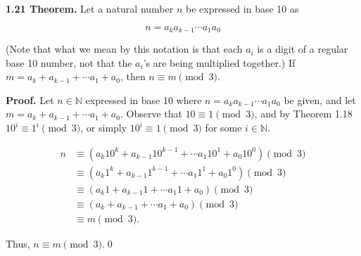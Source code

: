 \documentclass[12pt]{article}
\begin{document}
\noindent\textbf{1.21 Theorem.} Let a natural number $n$ be expressed in base 10 as

\begin{equation*}
n=a_k a_{k-1} \cdots a_1 a_0
\end{equation*}

\noindent (Note that what we mean by this notation is that each $a_i$ is a digit of a regular base 10 number, not that the $a_i$'s are being multiplied together.) If $m= a_k + a_{k-1} + \cdots a_1 + a_0$, then $n\equiv m\pmod{3}$.

\bigskip

\noindent\textbf{Proof.} Let $n\in\mathbb{N}$ expressed in base 10 where $n=a_k a_{k-1} \cdots a_1 a_0$ be given, and let $m= a_k + a_{k-1} + \cdots a_1 + a_0$. Observe that $10\equiv 1\pmod{3}$, and by Theorem 1.18 $10^i\equiv 1^i\pmod{3}$, or simply $10^i\equiv 1\pmod{3}$ for some $i\in\mathbb{N}$. 

\begin{align*}
n&\equiv ( a_k10^k + a_{k-1}10^{k-1} + \cdots a_1 10^1 + a_0 10^0 ) \pmod{3}\\
&\equiv ( a_k 1^k + a_{k-1}1^{k-1} + \cdots a_1 1^1 + a_0 1^0 ) \pmod{3}\\
&\equiv ( a_k 1 + a_{k-1}1 + \cdots a_1 1 + a_0 ) \pmod{3}\\
&\equiv ( a_k + a_{k-1} + \cdots a_1 + a_0 ) \pmod{3}\\
&\equiv m \pmod{3}.
\end{align*}

\noindent Thus, $n\equiv m\pmod{3}$.\qed
\end{document}
